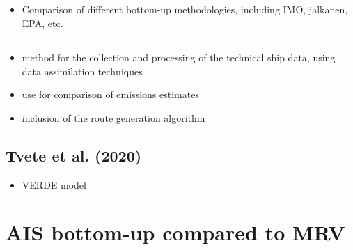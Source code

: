 \documentclass{article}
\newcommand{\paperpath}{../resources/}
\newcommand{\myhref}[2]{\href{run:\paperpath#1}{#2}}
\begin{document}
\subsection{\myhref{Moreno-Gutierrez 2019 - Comparative analysis between different methods for calculating.pdf}{\textcite{moreno2019comparative}}}
\begin{itemize}
    \item Comparison of different bottom-up methodologies, including IMO, jalkanen, EPA, etc.
\end{itemize}
\subsection{\myhref{Johansson et al 2017 - Global assessment of shipping emissions in 2015 on a high spatial and temporal resolution}{\textcite{johansson2017global}}}
\begin{itemize}
    \item method for the collection and processing of the technical ship data, using data assimilation techniques
    \item use for comparison of emissions estimates
    \item inclusion of the route generation algorithm
\end{itemize}
\subsection{Tvete et al. (2020)}
\begin{itemize}
    \item VERDE model
\end{itemize}

\section{AIS bottom-up compared to MRV}
\end{document}
